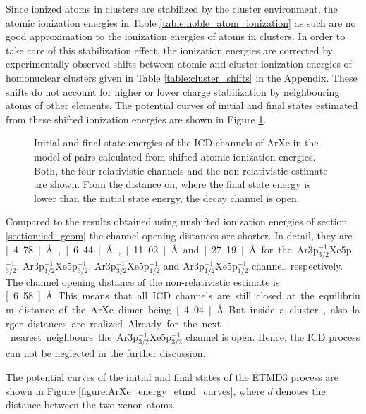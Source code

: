 Since ionized atoms in clusters are stabilized by the cluster environment,
the atomic
ionization energies  in Table \ref{table:noble_atom_ionization} as such
are no good approximation to the ionization energies of atoms in clusters.
In order to take care of
this stabilization effect, the ionization energies are corrected by experimentally
observed shifts between atomic and cluster ionization energies of homonuclear
clusters given in Table
\ref{table:cluster_shifts} in the Appendix. These shifts do not account for
higher or
lower charge stabilization by neighbouring atoms of other elements.
The potential curves of
initial and final states estimated from these shifted ionization energies
are shown in Figure \ref{ArXe_energy_curves_shifted}.

\begin{figure}[htb]
 \centering
 
 \caption{Initial and final state energies of the ICD channels of ArXe in the
          model of pairs calculated from shifted atomic ionization energies.
          Both, the four relativistic channels and
          the non-relativistic estimate are shown. From the distance on, where
          the final state energy is lower than the initial state energy, the
          decay channel is open.}
 \label{ArXe_energy_curves_shifted}
\end{figure}

Compared to the results obtained using unshifted ionization energies of section
\ref{section:icd_geom} the
channel opening distances are shorter.
In detail, they are \unit[4.78]{\AA}, \unit[6.44]{\AA}, \unit[11.02]{\AA}
and \unit[27.19]{\AA} for the Ar3p$_{3/2}^{-1}$Xe5p$_{3/2}^{-1}$,
Ar3p$_{1/2}^{-1}$Xe5p$_{3/2}^{-1}$, Ar3p$_{3/2}^{-1}$Xe5p$_{1/2}^{-1}$ and
Ar3p$_{1/2}^{-1}$Xe5p$_{1/2}^{-1}$ channel, respectively. The channel
opening distance of the non-relativistic estimate is \unit[6.58]{\AA}.
This means that all \ac{ICD} channels are still closed at the equilibrium
distance of the ArXe dimer being \unit[4.04]{\AA}. But inside a
cluster, also larger distances are
realized. Already for the next-nearest neighbours the
Ar3p$_{3/2}^{-1}$Xe5p$_{3/2}^{-1}$ channel is open. Hence, the \ac{ICD}
process can not be neglected in the further discussion.

The potential curves of the initial and final states of the \ac{ETMD}3
process are shown in Figure \ref{figure:ArXe_energy_etmd_curves}, where
$d$ denotes the distance between the two xenon atoms.

